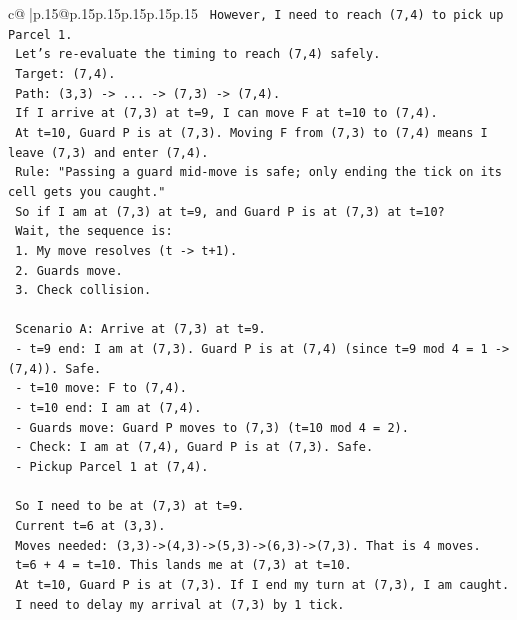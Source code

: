 \documentclass{article}
\begin{document}
{\begin{supertabular}{c@{$\;$}|p{.15\linewidth}@{}p{.15\linewidth}p{.15\linewidth}p{.15\linewidth}p{.15\linewidth}p{.15\linewidth}}
{{{\texttt{   However, I need to reach (7,4) to pick up Parcel 1.} \\
\texttt{   Let's re{-}evaluate the timing to reach (7,4) safely.} \\
\texttt{   Target: (7,4).} \\
\texttt{   Path: (3,3) {-}> ... {-}> (7,3) {-}> (7,4).} \\
\texttt{   If I arrive at (7,3) at t=9, I can move F at t=10 to (7,4).} \\
\texttt{   At t=10, Guard P is at (7,3). Moving F from (7,3) to (7,4) means I leave (7,3) and enter (7,4).} \\
\texttt{   Rule: "Passing a guard mid{-}move is safe; only ending the tick on its cell gets you caught."} \\
\texttt{   So if I am at (7,3) at t=9, and Guard P is at (7,3) at t=10?} \\
\texttt{   Wait, the sequence is:} \\
\texttt{   1. My move resolves (t {-}> t+1).} \\
\texttt{   2. Guards move.} \\
\texttt{   3. Check collision.} \\
\\ 
\texttt{   Scenario A: Arrive at (7,3) at t=9.} \\
\texttt{   {-} t=9 end: I am at (7,3). Guard P is at (7,4) (since t=9 mod 4 = 1 {-}> (7,4)). Safe.} \\
\texttt{   {-} t=10 move: F to (7,4).} \\
\texttt{   {-} t=10 end: I am at (7,4).} \\
\texttt{   {-} Guards move: Guard P moves to (7,3) (t=10 mod 4 = 2).} \\
\texttt{   {-} Check: I am at (7,4), Guard P is at (7,3). Safe.} \\
\texttt{   {-} Pickup Parcel 1 at (7,4).} \\
\\ 
\texttt{   So I need to be at (7,3) at t=9.} \\
\texttt{   Current t=6 at (3,3).} \\
\texttt{   Moves needed: (3,3){-}>(4,3){-}>(5,3){-}>(6,3){-}>(7,3). That is 4 moves.} \\
\texttt{   t=6 + 4 = t=10. This lands me at (7,3) at t=10.} \\
\texttt{   At t=10, Guard P is at (7,3). If I end my turn at (7,3), I am caught.} \\
\texttt{   I need to delay my arrival at (7,3) by 1 tick.} \\
}}}
\end{supertabular}}
\end{document}
